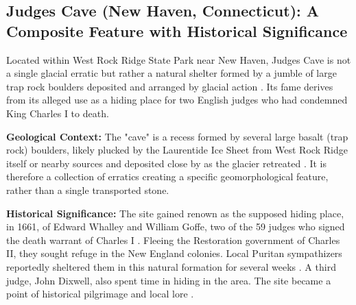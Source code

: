 \subsection{Judges Cave (New Haven, Connecticut): A Composite Feature with Historical Significance}
\label{subsec:judges_cave}

Located within West Rock Ridge State Park near New Haven, Judges Cave is not a single glacial erratic but rather a natural shelter formed by a jumble of large trap rock boulders deposited and arranged by glacial action \cite{Dana1891, Stiles1794}. Its fame derives from its alleged use as a hiding place for two English judges who had condemned King Charles I to death.

\textbf{Geological Context:} The "cave" is a recess formed by several large basalt (trap rock) boulders, likely plucked by the Laurentide Ice Sheet from West Rock Ridge itself or nearby sources and deposited close by as the glacier retreated \cite{Dana1891, Rice1906}. It is therefore a collection of erratics creating a specific geomorphological feature, rather than a single transported stone.

\textbf{Historical Significance:} The site gained renown as the supposed hiding place, in 1661, of Edward Whalley and William Goffe, two of the 59 judges who signed the death warrant of Charles I \cite{Stiles1794, onlyinyourstateLearnFascinating}. Fleeing the Restoration government of Charles II, they sought refuge in the New England colonies. Local Puritan sympathizers reportedly sheltered them in this natural formation for several weeks \cite{Stiles1794}. A third judge, John Dixwell, also spent time in hiding in the area. The site became a point of historical pilgrimage and local lore \cite{onlyinyourstateLearnFascinating}.

